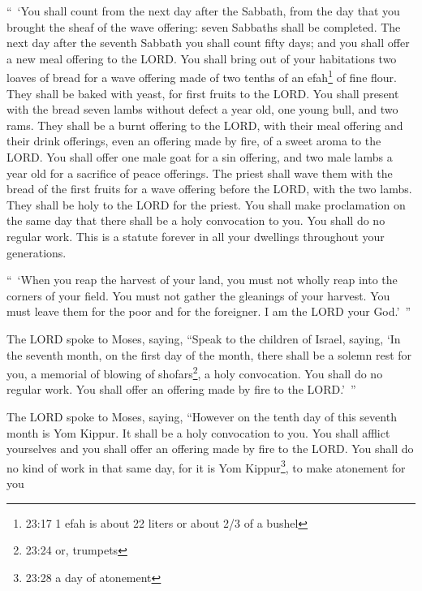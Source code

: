 \myverse{}“ ‘You shall count from the next day after the Sabbath, from
the day that you brought the sheaf of the wave offering: seven Sabbaths shall be completed.
\myverse{}The next day after the seventh Sabbath you shall count fifty days; and you
shall offer a new meal offering to the LORD.
\myverse{}You shall bring out of your habitations two loaves of bread for a wave offering
made of two tenths of an efah\footnote{23:17 1 efah is about 22 liters or about 2/3 of a bushel} of fine flour. They shall be baked
with yeast, for first fruits to the LORD.
\myverse{}You shall present with the bread seven lambs without defect a year old, one
young bull, and two rams. They shall be a burnt offering to the LORD, with their meal offering and their
drink offerings, even an offering made by fire, of a sweet aroma to the LORD.
\myverse{}You shall offer one male goat for a sin offering, and two male lambs a year
old for a sacrifice of peace offerings.
\myverse{}The priest shall wave them with the bread of the first fruits for a wave
offering before the LORD, with the two lambs. They shall be holy to the LORD for the priest.
\myverse{}You shall make proclamation on the same day that there shall be a holy convocation
to you. You shall do no regular work. This is a statute forever in all your dwellings throughout your
generations.


\myverse{}“ ‘When you reap the harvest of your land, you must not wholly
reap into the corners of your field. You must not gather the gleanings of your harvest. You must leave
them for the poor and for the foreigner. I am the LORD your God.’ ”


\myverse{}The LORD spoke to Moses, saying,
\myverse{}“Speak to the children of Israel, saying, ‘In the seventh month, on the first
day of the month, there shall be a solemn rest for you, a memorial of blowing of shofars\footnote{23:24 or, trumpets},
a holy convocation.
\myverse{}You shall do no regular work. You shall offer an offering made by fire to
the LORD.’ ”


\myverse{}The LORD spoke to Moses, saying,
\myverse{}“However on the tenth day of this seventh month is Yom Kippur. It shall be
a holy convocation to you. You shall afflict yourselves and you shall offer an offering made by fire to
the LORD.
\myverse{}You shall do no kind of work in that same day, for it is Yom Kippur\footnote{23:28 a day of atonement},
to make atonement for you 



